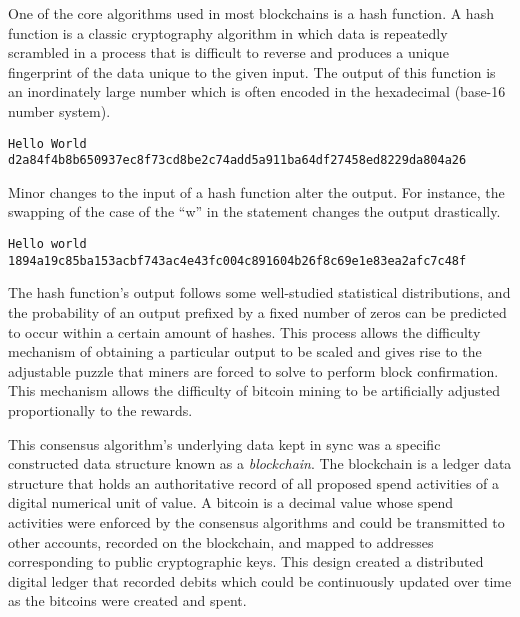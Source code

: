 
One of the core algorithms used in most blockchains is a hash function. A hash
function is a classic cryptography algorithm in which data is repeatedly
scrambled in a process that is difficult to reverse and produces a unique
fingerprint of the data unique to the given input. The output of this function
is an inordinately large number which is often encoded in the hexadecimal
(base-16 number system).


\begin{verbatim}
Hello World
d2a84f4b8b650937ec8f73cd8be2c74add5a911ba64df27458ed8229da804a26
\end{verbatim}

Minor changes to the input of a hash function alter the output. For instance,
the swapping of the case of the ``w'' in the statement changes the output
drastically.

\begin{verbatim}
Hello world
1894a19c85ba153acbf743ac4e43fc004c891604b26f8c69e1e83ea2afc7c48f
\end{verbatim}


The hash function's output follows some well-studied statistical distributions,
and the probability of an output prefixed by a fixed number of zeros can be
predicted to occur within a certain amount of hashes. This process allows the
difficulty mechanism of obtaining a particular output to be scaled and gives
rise to the adjustable puzzle that miners are forced to solve to perform block
confirmation. This mechanism allows the difficulty of bitcoin mining to be
artificially adjusted proportionally to the rewards.

This consensus algorithm's underlying data kept in sync was a specific
constructed data structure known as a \textit{blockchain}. The blockchain is a
ledger data structure that holds an authoritative record of all proposed spend
activities of a digital numerical unit of value. A bitcoin is a decimal value
whose spend activities were enforced by the consensus algorithms and could be
transmitted to other accounts, recorded on the blockchain, and mapped to
addresses corresponding to public cryptographic keys. This design created a
distributed digital ledger that recorded debits which could be continuously
updated over time as the bitcoins were created and spent.


